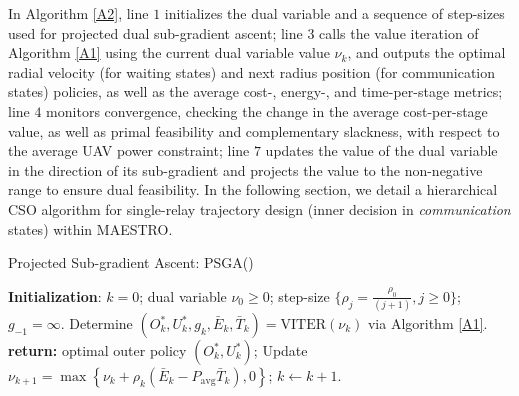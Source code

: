 \documentclass[12pt, draftcls, onecolumn]{IEEEtran}
\theoremstyle{plain}
\theoremstyle{definition}
\theoremstyle{remark}
\begin{document}
In Algorithm \ref{A2}, line $1$ initializes the dual variable and a sequence of step-sizes used for projected dual sub-gradient ascent; line $3$ calls the value iteration of Algorithm \ref{A1} using the current dual variable value $\nu_{k}$, and outputs the optimal radial velocity (for waiting states) and next radius position (for communication states) policies, as well as the average cost-, energy-, and time-per-stage metrics; line $4$ monitors convergence, checking the change in the average cost-per-stage value, as well as primal feasibility and complementary slackness, with respect to the average UAV power constraint; line $7$ updates the value of the dual variable in the direction of its sub-gradient and projects the value to the non-negative range to ensure dual feasibility. In the following section, we detail a hierarchical CSO algorithm for single-relay trajectory design (inner decision in \emph{communication} states) within MAESTRO.

\begin{algorithm}[t]
\caption{Projected Sub-gradient Ascent: PSGA()}\label{A2}
    \begin{algorithmic}[1]
    \scriptsize
    \State \textbf{Initialization}: $k{=}0$; dual variable $\nu_{0}{\geq}0$; step-size $\{\rho_{j}{=}\frac{\rho_{0}}{(j{+}1)},j{\geq}0\}$; $g_{-1}{=}\infty$.
    \vspace{0.1cm}
        \vspace{0.1cm}
    	\State Determine $(O_{k}^{*},U_{k}^{*},g_{k},\bar{E}_{k},\bar{T}_{k})=\mathrm{VITER}\left(\nu_{k}\right)$ via Algorithm \ref{A1}.
    	\vspace{0.1cm}
    	    \vspace{0.1cm}
    	    \State \textbf{return:} optimal outer policy $(O_{k}^{*},U_{k}^{*})$;
    	    \vspace{0.1cm}
    	\Else
    	    \vspace{0.1cm}
    		\State Update $\nu_{k{+}1}{=}\max\left\{\nu_{k}{+}\rho_{k}\left( \bar{E}_{k}{-}P_{\mathrm{avg}}\bar{T}_{k}\right),0\right\}$; $k{\gets}k{+}1$.
    		\vspace{0.1cm}
    	\EndIf
    	\vspace{0.1cm}
    \EndFor
    \end{algorithmic}
\end{algorithm}
\vspace{-4mm}
\end{document}
